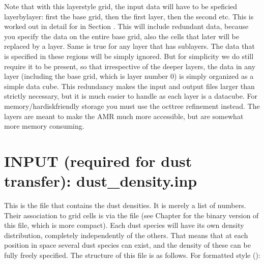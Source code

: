 \documentclass[letterpaper,10pt,english]{sphinxmanual}
\begin{document}
Note that with this layer\sphinxhyphen{}style grid, the input data will have to be speficied
layer\sphinxhyphen{}by\sphinxhyphen{}layer: first the base grid, then the first layer, then the second
etc. This is worked out in detail for  in Section
{\hyperref[\detokenize{inputoutputfiles:sec-dustdens}]{}}. This will include redundant data, because you specify the
data on the entire base grid, also the cells that later will be replaced by a
layer. Same is true for any layer that has sub\sphinxhyphen{}layers. The data that is
specified in these regions will be simply ignored. But for simplicity we do
still require it to be present, so that irrespective of the deeper layers, the
data in any layer (including the base grid, which is layer number 0) is simply
organized as a simple data cube. This redundancy makes the input and output
files larger than strictly necessary, but it is much easier to handle as each
layer is a datacube. For memory/hardisk\sphinxhyphen{}friendly storage you must use the
oct\sphinxhyphen{}tree refinement instead. The layers are meant to make the AMR much more
accessible, but are somewhat more memory consuming.


\section{INPUT (required for dust transfer): dust\_density.inp}
\label{\detokenize{inputoutputfiles:input-required-for-dust-transfer-dust-density-inp}}\label{\detokenize{inputoutputfiles:sec-dustdens}}
This is the file that contains the dust densities. It is merely a list of
numbers. Their association to grid cells is via the file  (see
Chapter {\hyperref[\detokenize{binaryio:chap-binary-io}]{}} for the binary version of this file, which is more
compact).  Each dust species will have its own density distribution, completely
independently of the others. That means that at each position in space several
dust species can exist, and the density of these can be fully freely
specified. The structure of this file is as follows. For formatted style
():

\begin{sphinxVerbatim}[commandchars=\\\{\}]
                                      
\PYG{p}{[}\PYG{p}{]}
\PYG{p}{[}\PYG{p}{]}
\PYG{p}{[}\PYG{p}{]}
\PYG{p}{[}\PYG{p}{]}
\end{sphinxVerbatim}
\end{document}
